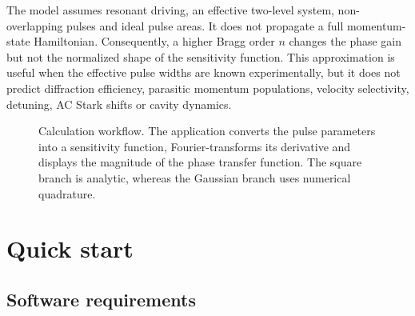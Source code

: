 \documentclass[11pt,a4paper]{article}
\newcommand{\Hphi}{H_{\varphi}}
\newcommand{\tauhalf}{\tau_{\pi/2}}
\newcommand{\taupi}{\tau_{\pi}}
\begin{document}
The model assumes resonant driving, an effective two-level system, non-overlapping pulses and ideal pulse areas. It does not propagate a full momentum-state Hamiltonian. Consequently, a higher Bragg order $n$ changes the phase gain but not the normalized shape of the sensitivity function. This approximation is useful when the effective pulse widths are known experimentally, but it does not predict diffraction efficiency, parasitic momentum populations, velocity selectivity, detuning, AC Stark shifts or cavity dynamics.

\begin{figure}[H]
\centering
{}
\caption{Calculation workflow. The application converts the pulse parameters into a sensitivity function, Fourier-transforms its derivative and displays the magnitude of the phase transfer function. The square branch is analytic, whereas the Gaussian branch uses numerical quadrature.}
\label{fig:workflow}
\end{figure}

\section{Quick start}

\subsection{Software requirements}
\end{document}
